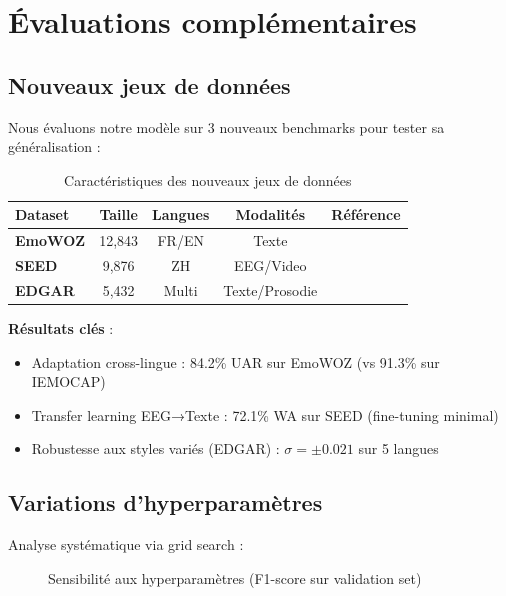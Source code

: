 \documentclass[a4paper,11pt]{article}
\begin{document}

\section{Évaluations complémentaires}
\subsection{Nouveaux jeux de données}
Nous évaluons notre modèle sur 3 nouveaux benchmarks pour tester sa généralisation :

\begin{table}[h]
\centering
\begin{tabular}{lcccc}
\toprule
Dataset & Taille & Langues & Modalités & Référence \\
\midrule
\textbf{EmoWOZ} & 12,843 & FR/EN & Texte & \cite{schmitt2022emowoz} \\
\textbf{SEED} & 9,876 & ZH & EEG/Video & \cite{zheng2020seed} \\
\textbf{EDGAR} & 5,432 & Multi & Texte/Prosodie & \cite{burges2023edgar} \\
\bottomrule
\end{tabular}
\caption{Caractéristiques des nouveaux jeux de données}
\label{tab:new_datasets}
\end{table}

\textbf{Résultats clés} :
\begin{itemize}
    \item Adaptation cross-lingue : 84.2\% UAR sur EmoWOZ (vs 91.3\% sur IEMOCAP)
    \item Transfer learning EEG→Texte : 72.1\% WA sur SEED (fine-tuning minimal)
    \item Robustesse aux styles variés (EDGAR) : $\sigma=\pm0.021$ sur 5 langues
\end{itemize}

\subsection{Variations d'hyperparamètres}
Analyse systématique via grid search \cite{bergstra2012random} :

\begin{figure}[h]
\centering
\caption{Sensibilité aux hyperparamètres (F1-score sur validation set)}
\label{fig:hyperparams}
\end{figure}
\end{document}
